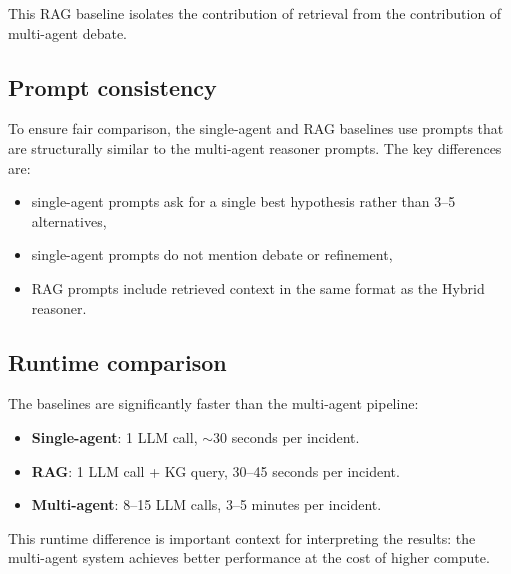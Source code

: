 This RAG baseline isolates the contribution of retrieval from the contribution of multi-agent
debate.

\subsection{Prompt consistency}
To ensure fair comparison, the single-agent and RAG baselines use prompts that are structurally
similar to the multi-agent reasoner prompts. The key differences are:
\begin{itemize}
  \item single-agent prompts ask for a single best hypothesis rather than 3--5 alternatives,
  \item single-agent prompts do not mention debate or refinement,
  \item RAG prompts include retrieved context in the same format as the Hybrid reasoner.
\end{itemize}

\subsection{Runtime comparison}
The baselines are significantly faster than the multi-agent pipeline:
\begin{itemize}
  \item \textbf{Single-agent}: 1 LLM call, $\sim$30 seconds per incident.
  \item \textbf{RAG}: 1 LLM call + KG query, 30--45 seconds per incident.
  \item \textbf{Multi-agent}: 8--15 LLM calls, 3--5 minutes per incident.
\end{itemize}

This runtime difference is important context for interpreting the results: the multi-agent system
achieves better performance at the cost of higher compute.
